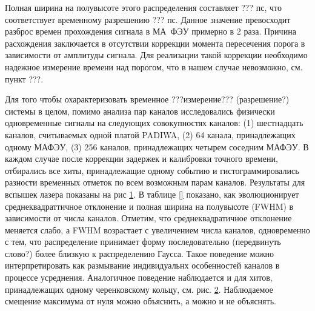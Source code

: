 Полная ширина на полувысоте этого распределения составляет ??? пс, что соответствует временному разрешению ??? пс. Данное значение превосходит разброс времен прохождения сигнала в МА~ФЭУ примерно в 2 раза. Причина расхождения заключается в отсутствии коррекции момента пересечения порога в зависимости от амплитуды сигнала. Для реализации такой коррекции необходимо надежное измерение времени над порогом, что в нашем случае невозможно, см. пункт ???.

Для того чтобы охарактеризовать временное ???измерение??? (разрешение?) системы в целом, помимо анализа пар каналов исследовались физически одновременные сигналы на следующих совокупностях каналов: (1) шестнадцать каналов, считываемых одной платой PADIWA, (2) 64 канала, принадлежащих одному МАФЭУ, (3) 256 каналов, принадлежащих четырем соседним МАФЭУ. В каждом случае после коррекции задержек и калибровки точного времени, отбирались все хиты, принадлежащие одному событию и гистограммировались разности временных отметок по всем возможным парам каналов. Результаты для вспышек лазера показаны на рис \ref{fig:TimeResEvolutionLaser}. В таблице \ref{} показано, как эволюционирует среднеквадраттичное отклонение и полная ширина на полувысоте (FWHM) в зависимости от числа каналов. Отметим, что среднеквадратичное отклонение меняется слабо, а FWHM возрастает с увеличением числа каналов, одновременно с тем, что распределение принимает форму последовательно (передвинуть слово?) более близкую к распределению Гаусса. Такое поведение можно интерпретировать как размывание индивидуальнх особенностей каналов в процессе усреднения. Аналогичное поведение наблюдается и для хитов, принадлежащих одному черенковскому кольцу, см. рис. \ref{fig:TimeResEvolutionRings}. Наблюдаемое смещение максимума от нуля можно объяснить, а можно и не объяснять.

\begin{figure}
\label{fig:TimeResEvolutionLaser}
\end{figure}


\begin{figure}
\label{fig:TimeResEvolutionRings}
\end{figure}